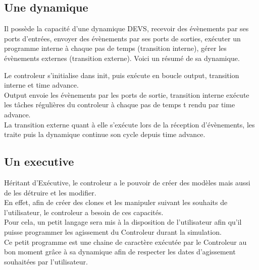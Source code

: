 \subsection{Une dynamique}
Il possède la capacité d'une dynamique DEVS, recevoir des évènements par ses ports d'entrées, envoyer des évènements par ses ports de sorties, exécuter un programme interne à chaque pas de temps (transition interne), gérer les évènements externes (transition externe). Voici un résumé de sa dynamique. \\
\noindent\begin{minipage}{\linewidth}%
\end{minipage}

Le controleur s'initialise dans init, puis exécute en boucle output, transition interne et time advance. \\
Output envoie les évènements par les ports de sortie, transition interne exécute les tâches régulières du controleur à chaque pas de temps t rendu par time advance.\\
La transition externe quant à elle s'exécute lors de la réception d'évènements, les traite puis la dynamique continue son cycle depuis time advance.

\subsection{Un executive}
Héritant d'Exécutive, le controleur a le pouvoir de créer des modèles mais aussi de les détruire et les modifier.\\
En effet, afin de créer des clones et les manipuler suivant les souhaits de l'utilisateur, le controleur a besoin de ces capacités.\\
Pour cela, un petit langage sera mis à la disposition de l'utilisateur afin qu'il puisse programmer les agissement du Controleur durant la simulation. \\
Ce petit programme est une chaine de caractère exécutée par le Controleur au bon moment grâce à sa dynamique afin de respecter les dates d'agissement souhaitées par l'utilisateur.

